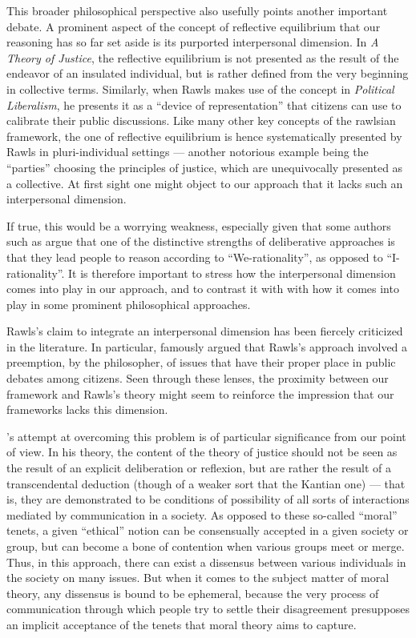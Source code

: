 \documentclass[version=3.21, pagesize, twoside=off, bibliography=totoc, DIV=calc, fontsize=12pt, a4paper, french, english]{scrartcl}
\begin{document}
This broader philosophical perspective also usefully points another important debate. 
A prominent aspect of the concept of reflective equilibrium that our reasoning has so far set aside is its purported interpersonal dimension. 
In \emph{A Theory of Justice}, the reflective equilibrium is not presented as the result of the endeavor of an insulated individual, but is rather defined from the very beginning in collective terms. 
Similarly, when Rawls makes use of the concept in \emph{Political Liberalism}, he presents it as a  “device of representation” that citizens can use to calibrate their public discussions. 
Like many other key concepts of the rawlsian framework, the one of reflective equilibrium is hence systematically presented by Rawls in pluri-individual settings --- another notorious example being the “parties” choosing the principles of justice, which are unequivocally presented as a collective. 
At first sight one might object to our approach that it lacks such an interpersonal dimension.

If true, this would be a worrying weakness, especially given that some authors such as \citet{vatn_institutional_2009} argue that one of the distinctive strengths of deliberative approaches is that they lead people to reason according to ``We-rationality'', as opposed to ``I-rationality''. 
It is therefore important to stress how the interpersonal dimension comes into play in our approach, and to contrast it with with how it comes into play in some prominent philosophical approaches.

Rawls's claim to integrate an interpersonal dimension has been fiercely criticized in the literature. 
In particular, \citet{habermas_short_1999} famously argued that Rawls's approach involved a preemption, by the philosopher, of issues that have their proper place in public debates among citizens. 
Seen through these lenses, the proximity between our framework and Rawls's theory might seem to reinforce the impression that our frameworks lacks this dimension.

\citeauthor{habermas_moralbewustsein_1983}'s \citeyearpar{habermas_moralbewustsein_1983} attempt at overcoming this problem is of particular significance from our point of view. 
In his theory, the content of the theory of justice should not be seen as the result of an explicit deliberation or reflexion, but are rather the result of a transcendental deduction (though of a weaker sort that the Kantian one) --- that is, they are demonstrated to be conditions of possibility of all sorts of interactions mediated by communication in a society. As opposed to these so-called “moral” tenets, a given “ethical” notion can be consensually accepted in a given society or group, but can become a bone of contention when various groups meet or merge. 
Thus, in this approach, there can exist a dissensus between various individuals in the society on many issues. 
But when it comes to the subject matter of moral theory, any dissensus is bound to be ephemeral, because the very process of communication through which people try to settle their disagreement presupposes an implicit acceptance of the tenets that moral theory aims to capture.
\end{document}
